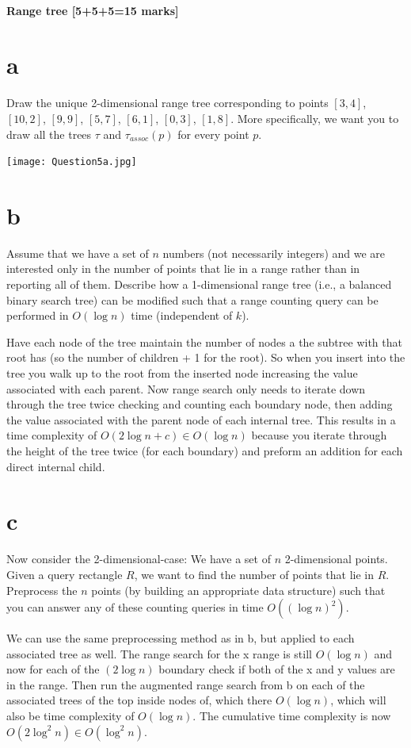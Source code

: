 \documentclass[12pt]{article}
\begin{document}
\subsection{Range tree [5+5+5=15 marks]}
\begin{enumerate}
\part{a} Draw the unique 2-dimensional range tree corresponding to points
$[ 3, 4 ]$, $[ 10, 2 ]$, $[ 9, 9 ]$, $[ 5, 7 ]$, $[ 6, 1 ]$, $[ 0, 3 ]$, $[ 1, 8 ]$.
More specifically, we want you to draw all the trees $\tau$ and $\tau_{assoc}(p)$
for every point $p$.
\begin{center}
  \texttt{[image: Question5a.jpg]}
\end{center}
\part{b} Assume that we have a set of $n$ numbers (not necessarily integers) and we are interested only in the number of points that lie in a range rather than in reporting all of them.  Describe how a 1-dimensional range tree (i.e., a balanced binary search tree) can be modified such that a range counting query can be performed in $O(\log{n})$ time
(independent of $k$).

Have each node of the tree maintain the number of nodes a the subtree with that root has (so the number of children + 1 for the root). So when you insert into the tree you walk up to the root from the inserted node increasing the value associated with each parent. Now range search only needs to iterate down through the tree twice checking and counting each boundary node, then adding the value associated with the parent node of each internal tree. This results in a time complexity of $O(2\log n + c) \in O(\log n)$ because you iterate through the height of the tree twice (for each boundary) and preform an addition for each direct internal child.

\part{c} Now consider the 2-dimensional-case: We have a set of $n$ 2-dimensional points.  Given a query rectangle $R$, we want to find the number of points that lie in $R$.  Preprocess the $n$ points (by building an appropriate data structure) such that you can answer any of these counting queries in time $O((\log n)^2)$.

We can use the same preprocessing method as in b, but applied to each associated tree as well. The range search for the x range is still $O(\log n)$ and now for each of the $(2\log n)$ boundary check if both of the x and y values are in the range. Then run the augmented range search from b on each of the associated trees of the top inside nodes of, which there $O(\log n)$, which will also be time complexity of $O(\log n)$. The cumulative time complexity is now $O(2\log^2 n) \in O(\log^2 n)$.

\end{enumerate}
\end{document}
